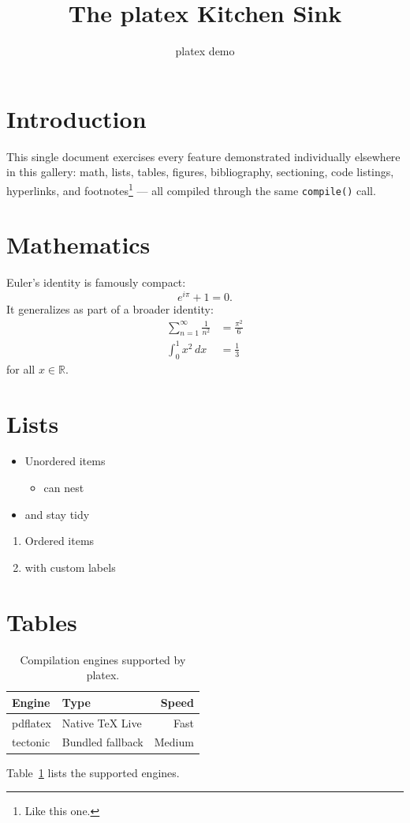 \documentclass{article}
\title{The platex Kitchen Sink}
\author{platex demo}
\date{}
\begin{document}
\maketitle
\tableofcontents

\section{Introduction}
This single document exercises every feature demonstrated individually
elsewhere in this gallery: math, lists, tables, figures, bibliography,
sectioning, code listings, hyperlinks, and footnotes\footnote{Like this
one.} — all compiled through the same \texttt{compile()} call.

\section{Mathematics}
Euler's identity is famously compact:
\[
  e^{i\pi} + 1 = 0.
\]
It generalizes as part of a broader identity:
\begin{align}
  \sum_{n=1}^{\infty} \frac{1}{n^2} &= \frac{\pi^2}{6} \\
  \int_0^1 x^2 \, dx &= \frac{1}{3}
\end{align}
for all $x \in \mathbb{R}$.

\section{Lists}
\begin{itemize}
  \item Unordered items
  \begin{itemize}
    \item can nest
  \end{itemize}
  \item and stay tidy
\end{itemize}
\begin{enumerate}[label=(\alph*)]
  \item Ordered items
  \item with custom labels
\end{enumerate}

\section{Tables}
\begin{table}[h]
  \centering
  \begin{tabular}{l l r}
    \toprule
    Engine & Type & Speed \\
    \midrule
    pdflatex & Native TeX Live & Fast \\
    tectonic & Bundled fallback & Medium \\
    \bottomrule
  \end{tabular}
  \caption{Compilation engines supported by platex.}
  \label{tab:engines}
\end{table}
Table~\ref{tab:engines} lists the supported engines.
\end{document}
